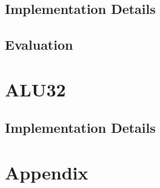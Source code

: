 \documentclass{article}
\begin{document}
\subsection{Implementation Details}
\subsection{Evaluation}


\section{ALU32}

\subsection{Implementation Details}
\section{Appendix}








\end{document}
